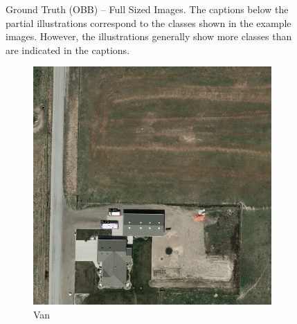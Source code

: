 \begin{figure}[h!]
    \caption[Ground Truth (OBB) – Full Sized Images]{Ground Truth (OBB) – Full Sized Images. The captions below the partial illustrations correspond to the classes shown in the example images. However, the illustrations generally show more classes than are indicated in the captions.}
    \label{fig:gt_obb_examples_fs}
\end{figure}




\begin{figure}[h!]
    \centering
    \begin{subfigure}[t]{0.38\textwidth}
        \centering
        \includegraphics[width=\linewidth]{images/015Results/01abb_vs_obb/comp_images/abb/198.png}
        \caption{Van}
    \end{subfigure}
    \begin{subfigure}[t]{0.38\textwidth}
        \centering

\end{subfigure}
\end{figure}
